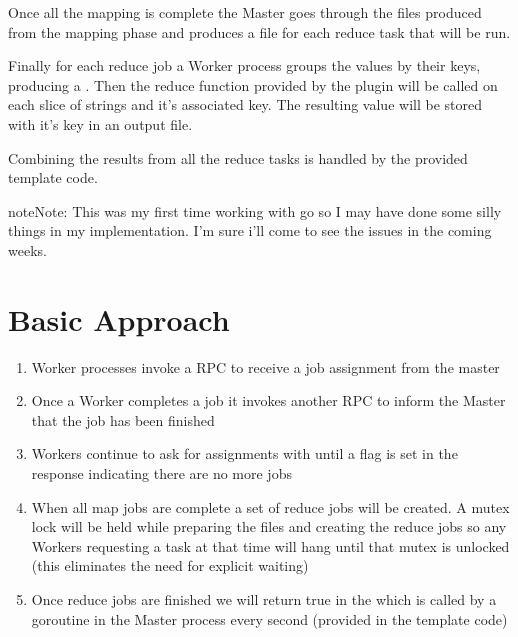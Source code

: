 \documentclass[letterpaper,10pt,english]{sphinxmanual}
\begin{document}
Once all the mapping is complete the Master goes through
the files produced from the mapping phase
and produces a file for each reduce task that will be run.

Finally for each reduce job a Worker process groups
the values by their keys, producing
a . Then the reduce function
provided by the plug\sphinxhyphen{}in will be called  on each
slice of strings and it’s associated key.
The resulting value will be stored with it’s key in
an output file.

Combining the results from all the reduce tasks is handled
by the provided template code.

\begin{sphinxadmonition}{note}{Note:}
This was my first time working with go so I may have done some
silly things in my implementation. I’m sure i’ll come to see
the issues in the coming weeks.
\end{sphinxadmonition}


\section{Basic Approach}
\label{\detokenize{labs/lab2:basic-approach}}\begin{enumerate}
%
\item {} 
Worker processes invoke a RPC  to receive
a job assignment from the master

\item {} 
Once a Worker completes a job it invokes another RPC 
to inform the Master that the job has been finished

\item {} 
Workers continue to ask for assignments with 
until a  flag is set in the response indicating there are
no more jobs

\item {} 
When all map jobs are complete a set of reduce jobs will be created.
A mutex lock will be held while preparing the files and creating the reduce
jobs so any Workers requesting a task at that time will hang until that
mutex is unlocked (this eliminates the need for explicit waiting)

\item {} 
Once reduce jobs are finished we will return true in the 
which is called by a goroutine in the Master process every second (provided in the template code)

\end{enumerate}
\end{document}
